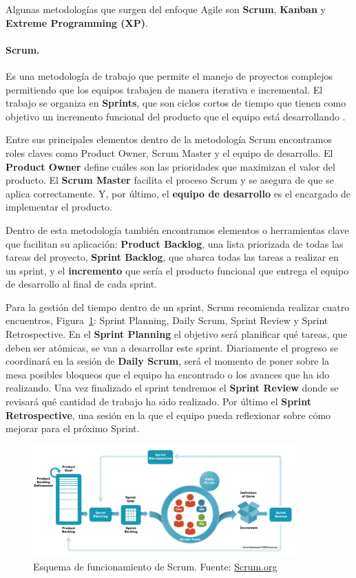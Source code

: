 Algunas metodologías que surgen del enfoque Agile son \textbf{Scrum}, \textbf{Kanban} y \textbf{Extreme Programming (XP)}.

\paragraph{Scrum.} Es una metodología de trabajo que permite el manejo de proyectos complejos permitiendo que los equipos trabajen de manera iterativa e incremental. El trabajo se organiza en \textbf{Sprints}, que son ciclos cortos de tiempo que tienen como objetivo un incremento funcional del producto que el equipo está desarrollando \cite{scrum, what-is-scrum}.

Entre sus principales elementos dentro de la metodología Scrum encontramos roles claves como Product Owner, Scrum Master y el equipo de desarrollo. El \textbf{Product Owner} define cuáles son las prioridades que maximizan el valor del producto. El \textbf{Scrum Master} facilita el proceso Scrum y se asegura de que se aplica correctamente. Y, por último, el \textbf{equipo de desarrollo} es el encargado de implementar el producto.

Dentro de esta metodología también encontramos elementos o herramientas clave que facilitan su aplicación: \textbf{Product Backlog}, una lista priorizada de todas las tareas del proyecto, \textbf{Sprint Backlog}, que abarca todas las tareas a realizar en un sprint, y el \textbf{incremento} que sería el producto funcional que entrega el equipo de desarrollo al final de cada sprint.

Para la gestión del tiempo dentro de un sprint, Scrum recomienda realizar cuatro encuentros, Figura~\ref{fig:scrum}: Sprint Planning, Daily Scrum, Sprint Review y Sprint Retrospective. En el \textbf{Sprint Planning} el objetivo será planificar qué tareas, que deben ser atómicas, se van a desarrollar este sprint. Diariamente el progreso se coordinará en la sesión de \textbf{Daily Scrum}, será el momento de poner sobre la mesa posibles bloqueos que el equipo ha encontrado o los avances que ha ido realizando. Una vez finalizado el sprint tendremos el \textbf{Sprint Review} donde se revisará qué cantidad de trabajo ha sido realizado. Por último el \textbf{Sprint Retrospective}, una sesión en la que el equipo pueda reflexionar sobre cómo mejorar para el próximo Sprint.

\begin{figure}[H]
\centering
\includegraphics[width=0.9\textwidth]{./img/methodologies/scrum.png}
\caption{Esquema de funcionamiento de Scrum.  Fuente: \href{https://www.scrum.org/learning-series/what-is-scrum/}{Scrum.org}}
\label{fig:scrum}
\end{figure}

